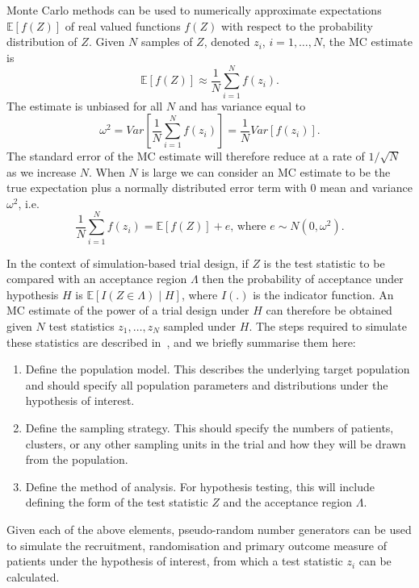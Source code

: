 \documentclass[]{sagej}
\begin{document}
Monte Carlo methods can be used to numerically approximate expectations $\mathbb{E}[f(Z)]$ of real valued functions $f(Z)$ with respect to the probability distribution of $Z$. Given $N$ samples of $Z$, denoted $z_{i}$, $i=1,\ldots,N$, the MC estimate is
\begin{equation}
\mathbb{E}[f(Z)] \approx \frac{1}{N} \sum_{i=1}^{N} f(z_{i}).
\end{equation}
The estimate is unbiased for all $N$ and has variance equal to
\begin{equation}
\omega^{2} = Var \left[ \frac{1}{N} \sum_{i=1}^{N} f(z_{i}) \right] = \frac{1}{N} Var \left[ f(z_{i}) \right].
\end{equation}
The standard error of the MC estimate will therefore reduce at a rate of $1/\sqrt{N}$ as we increase $N$. When $N$ is large we can consider an MC estimate to be the true expectation plus a normally distributed error term with 0 mean and variance $\omega^{2}$, i.e.
\begin{equation}\label{eqn:MC_error}
\frac{1}{N} \sum_{i=1}^{N} f(z_{i}) = \mathbb{E}[f(Z)] + e \text{, where } e \sim N(0, \omega^{2}).
\end{equation}

In the context of simulation-based trial design, if $Z$ is the test statistic to be compared with an acceptance region $\Lambda$ then the probability of acceptance under hypothesis $H$ is $\mathbb{E}[I(Z \in \Lambda) \mid H]$, where $I(.)$ is the indicator function. An MC estimate of the power of a trial design under $H$ can therefore be obtained given $N$ test statistics $z_{1}, \ldots , z_{N}$ sampled under $H$. The steps required to simulate these statistics are described in~\cite{Landau2013}, and we briefly summarise them here:
\begin{enumerate}
\item Define the population model. This describes the underlying target population and should specify all population parameters and distributions under the hypothesis of interest.
\item Define the sampling strategy. This should specify the numbers of patients, clusters, or any other sampling units in the trial and how they will be drawn from the population.
\item Define the method of analysis. For hypothesis testing, this will include defining the form of the test statistic $Z$ and the acceptance region $\Lambda$.
\end{enumerate}
Given each of the above elements, pseudo-random number generators can be used to simulate the recruitment, randomisation and primary outcome measure of patients under the hypothesis of interest, from which a test statistic $z_{i}$ can be calculated. 
\end{document}
